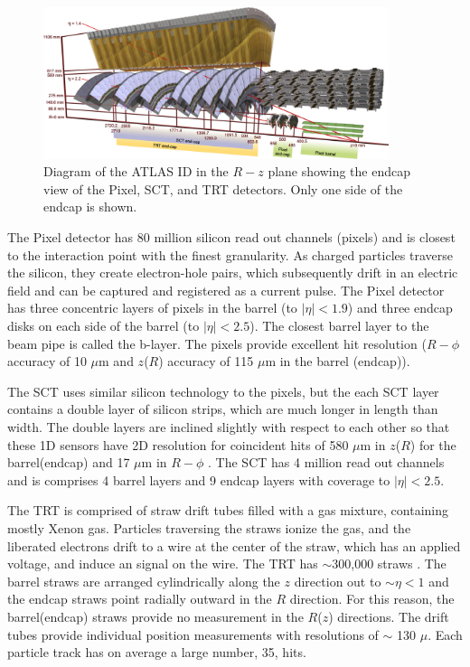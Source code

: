 \begin{figure}[!t]
\centering 
\includegraphics[width=0.9\textwidth]{figs/lhc/IDEndcap-eps-converted-to}
\caption{ Diagram of the ATLAS ID in the $R-z$ plane showing the endcap view of the Pixel, SCT, and TRT detectors. Only one side of the endcap is shown. 
}
\label{figure:lhc_id_endcap}
\end{figure}

The Pixel detector has 80 million silicon read out channels (pixels) and is closest to the interaction point with the finest granularity. As charged particles traverse the silicon, they create electron-hole pairs, which subsequently drift in an electric field and can be captured and registered as a current pulse. The Pixel detector has three concentric layers of pixels in the barrel (to $|\eta| < 1.9$) and three endcap disks on each side of the barrel (to $|\eta| < 2.5$). The closest barrel layer to the beam pipe is called the b-layer. The pixels provide excellent hit resolution ($R-\phi$ accuracy of 10 $\mu$m and $z$($R$) accuracy of 115 $\mu$m in the barrel (endcap)).

The SCT uses similar silicon technology to the pixels, but the each SCT layer contains a double layer of silicon strips, which are much longer in length than width. The double layers are inclined slightly with respect to each other so that these 1D sensors have 2D resolution for coincident hits of 580 $\mu$m in $z$($R$) for the barrel(endcap) and 17 $\mu$m in $R-\phi$ . The SCT has 4 million read out channels and is comprises 4 barrel layers and 9 endcap layers with coverage to $|\eta| < 2.5$.


The TRT is comprised of straw drift tubes filled with a gas mixture, containing mostly Xenon gas. Particles traversing the straws ionize the gas, and the liberated electrons drift to a wire at the center of the straw, which has an applied voltage, and induce an signal on the wire. The TRT has $\sim$300,000 straws . The barrel straws are arranged cylindrically along the $z$ direction out to $\sim \eta < 1$ and the endcap straws point radially outward in the $R$ direction. For this reason, the barrel(endcap) straws provide no measurement in the $R$($z$) directions. The drift tubes provide individual position measurements with resolutions of $\sim$ 130 $\mu$. Each particle track has on average a large number, 35, hits. 

